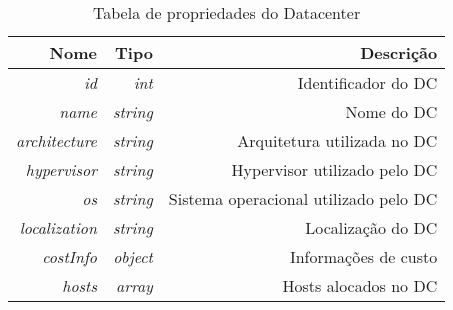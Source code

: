 \begin{table}[!htb]
    \centering
    \caption[Representação do Datacenter(DC)]{Tabela de propriedades do Datacenter
    \label{tab:datacenter-shape}}
    \begin{tabular}{rrr}
        \toprule
            Nome & Tipo & Descrição \\ 
        \midrule
            \textit{id} & \textit{int} & Identificador do DC\\
            \textit{name} & \textit{string} & Nome do DC \\
            \textit{architecture} & \textit{string} & Arquitetura utilizada no DC \\
            \textit{hypervisor} & \textit{string} & Hypervisor utilizado pelo DC \\
            \textit{os} & \textit{string} & Sistema operacional utilizado pelo DC \\
            \textit{localization} & \textit{string} & Localização do DC \\
            \textit{costInfo} & \textit{object} & Informações de custo \\
            \textit{hosts} & \textit{array} & Hosts alocados no DC \\
        \bottomrule
    \end{tabular}
\end{table}


